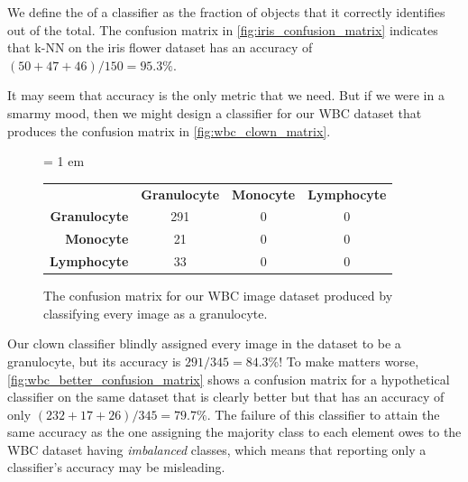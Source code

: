 \begin{note}\end{note}

We define the  of a classifier as the fraction of objects that it correctly identifies out of the total. The confusion matrix in \autoref{fig:iris_confusion_matrix} indicates that k-NN on the iris flower dataset has an accuracy of $(50 + 47 + 46)/150 = 95.3\%$.

It may seem that accuracy is the only metric that we need. But if we were in a smarmy mood, then we might design a classifier for our WBC dataset that produces the confusion matrix in \autoref{fig:wbc_clown_matrix}.\\

\begin{figure}[h]
\centering
\tabcolsep = 1 em
\mySfFamily
{}
\begin{tabular}{r c c c}
\rowcolor{gray!50}
& \textbf{Granulocyte} & \textbf{Monocyte} & \textbf{Lymphocyte} \\
\textbf{Granulocyte} & 291 & 0 & 0 \\
\textbf{Monocyte} & \phantom{5}21 & 0 & 0 \\
\textbf{Lymphocyte} & \phantom{5}33 & 0 & 0
\end{tabular}
\caption{The confusion matrix for our WBC image dataset produced by classifying every image as a granulocyte.}
\label{fig:wbc_clown_matrix}
\end{figure}

\begin{qbox}\end{qbox}

Our clown classifier blindly assigned every image in the dataset to be a granulocyte, but its accuracy is $291/345 = 84.3\%$! To make matters worse, \autoref{fig:wbc_better_confusion_matrix} shows a confusion matrix for a hypothetical classifier on the same dataset that is clearly better but that has an accuracy of only $(232 + 17 + 26)/345 = 79.7\%$. The failure of this classifier to attain the same accuracy as the one assigning the majority class to each element owes to the WBC dataset having \textit{imbalanced} classes, which means that reporting only a classifier's accuracy may be misleading.\\

